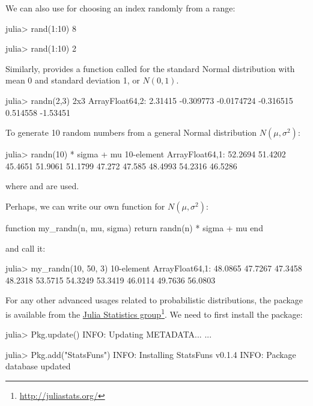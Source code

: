 We can also use  for choosing an index randomly from a range:
\begin{code}
julia> rand(1:10)
8

julia> rand(1:10)
2
\end{code}

Similarly, \julia{} provides a function called  for the standard Normal distribution with mean 0 and standard deviation 1, or $N(0,1)$.
\begin{code}
julia> randn(2,3)
2x3 Array{Float64,2}:
  2.31415   -0.309773  -0.0174724
 -0.316515   0.514558  -1.53451
\end{code}
\noindent To generate 10 random numbers from a general Normal distribution $N(\mu, \sigma^2)$:
\begin{code}
julia> randn(10) * sigma + mu
10-element Array{Float64,1}:
 52.2694
 51.4202
 45.4651
 51.9061
 51.1799
 47.272
 47.585
 48.4993
 54.2316
 46.5286
\end{code}
\noindent where  and  are used.

Perhaps, we can write our own function for $N(\mu, \sigma^2)$:
\begin{code}
function my_randn(n, mu, sigma)
	return randn(n) * sigma + mu
end
\end{code}
\noindent and call it:
\begin{code}
julia> my_randn(10, 50, 3)
10-element Array{Float64,1}:
 48.0865
 47.7267
 47.3458
 48.2318
 53.5715
 54.3249
 53.3419
 46.0114
 49.7636
 56.0803
\end{code}

For any other advanced usages related to probabilistic distributions, the  package is available from the \href{http://juliastats.org/}{Julia Statistics group}\footnote{\url{http://juliastats.org/}}. We need to first install the package:
\begin{code}
julia> Pkg.update()
INFO: Updating METADATA...
...

julia> Pkg.add("StatsFuns")
INFO: Installing StatsFuns v0.1.4
INFO: Package database updated
\end{code}

